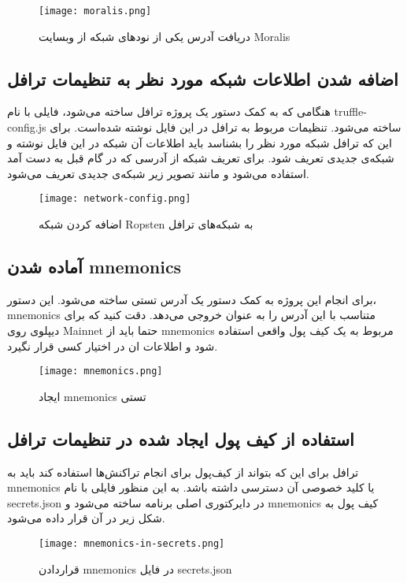 \begin{figure}[ht]
\centerline{\texttt{[image: moralis.png]}}
\caption{دریافت آدرس یکی از نود‌های شبکه از وبسایت Moralis}
\label{fig:moralis}
\end{figure}

\subsection{اضافه شدن اطلاعات شبکه مورد نظر به تنظیمات ترافل}
هنگامی که به کمک دستور
یک پروژه ترافل ساخته می‌شود، فایلی با نام truffle-config.js ساخته می‌شود. تنظیمات مربوط به ترافل در این فایل نوشته شده‌است. برای این که ترافل شبکه مورد نظر را بشناسد باید اطلاعات آن شبکه در این فایل نوشته و شبکه‌ی جدیدی تعریف شود. برای تعریف شبکه از آدرسی که در گام قبل به دست آمد استفاده می‌شود و مانند تصویر زیر شبکه‌ی جدیدی تعریف می‌شود.

\begin{figure}[ht]
\centerline{\texttt{[image: network-config.png]}}
\caption{اضافه کردن شبکه Ropsten به شبکه‌های ترافل}
\label{fig:network-config}
\end{figure}


\subsection{آماده شدن mnemonics}
برای انجام این پروژه به کمک دستور
یک آدرس تستی ساخته می‌شود. این دستور، mnemonics متناسب با این آدرس را به عنوان خروجی می‌دهد. دقت کنید که برای دیپلوی روی
\gls{Mainnet}
حتما باید از mnemonics مربوط به یک کیف پول واقعی استفاده شود و اطلاعات ان در اختیار کسی قرار نگیرد.

\begin{figure}[ht]
\centerline{\texttt{[image: mnemonics.png]}}
\caption{ایجاد mnemonics تستی}
\label{fig:mnemonics}
\end{figure}


\subsection{استفاده از کیف پول ایجاد شده در تنظیمات ترافل}
ترافل برای این که بتواند از کیف‌پول برای انجام تراکنش‌ها استفاده کند باید به mnemonics یا کلید خصوصی آن دسترسی داشته باشد. به این منظور فایلی با نام secrets.json در دایرکتوری اصلی برنامه ساخته می‌شود و mnemonics کیف پول به شکل زیر در آن قرار داده می‌شود.

\begin{figure}[ht]
\centerline{\texttt{[image: mnemonics-in-secrets.png]}}
\caption{قراردادن mnemonics در فایل secrets.json}
\label{fig:mnemonics-in-secrets}
\end{figure}

